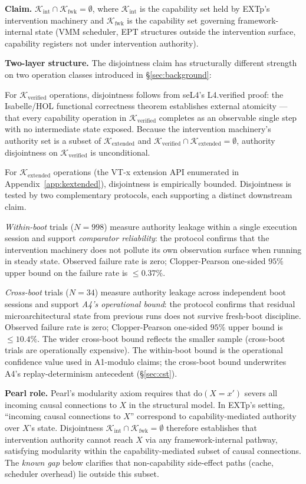 \documentclass[conference]{IEEEtran}
\newcommand{\Kverified}{\mathcal{K}_\text{verified}}
\newcommand{\Kextended}{\mathcal{K}_\text{extended}}
\newcommand{\Kint}{\mathcal{K}_\text{int}}
\newcommand{\Kfwk}{\mathcal{K}_\text{fwk}}
\newcommand{\dox}[1]{\text{do}(X{=}#1)}
\begin{document}
\textbf{Claim.} $\Kint \cap \Kfwk = \emptyset$, where $\Kint$ is the
capability set held by EXTp's intervention machinery and $\Kfwk$ is
the capability set governing framework-internal state (VMM
scheduler, EPT structures outside the intervention surface,
capability registers not under intervention authority).

\textbf{Two-layer structure.} The disjointness claim has structurally
different strength on two operation classes introduced in
\S\ref{sec:background}:

For $\Kverified$ operations, disjointness follows from seL4's
L4.verified proof: the Isabelle/HOL functional correctness theorem
establishes external atomicity --- that every capability operation
in $\Kverified$ completes as an observable single step with no
intermediate state exposed. Because the intervention machinery's
authority set is a subset of $\Kextended$ and $\Kverified \cap
\Kextended = \emptyset$, authority disjointness on $\Kverified$ is
unconditional.

For $\Kextended$ operations (the VT-x extension API enumerated in
Appendix~\ref{app:kextended}), disjointness is empirically bounded.
Disjointness is tested by two complementary protocols, each
supporting a distinct downstream claim.

\textit{Within-boot} trials ($N{=}998$) measure authority leakage
within a single execution session and support \emph{comparator
reliability}: the protocol confirms that the intervention
machinery does not pollute its own observation surface when
running in steady state. Observed failure rate is zero;
Clopper-Pearson one-sided $95\%$ upper bound on the failure rate
is $\leq 0.37\%$.

\textit{Cross-boot} trials ($N{=}34$) measure authority leakage
across independent boot sessions and support \emph{A4's
operational bound}: the protocol confirms that residual
microarchitectural state from previous runs does not survive
fresh-boot discipline. Observed failure rate is zero;
Clopper-Pearson one-sided $95\%$ upper bound is $\leq 10.4\%$.
The wider cross-boot bound reflects the smaller sample (cross-boot
trials are operationally expensive). The within-boot bound is
the operational confidence value used in A1-modulo claims; the
cross-boot bound underwrites A4's replay-determinism antecedent
(\S\ref{sec:cst}).

\textbf{Pearl role.} Pearl's modularity axiom requires that
$\dox{x'}$ severs all incoming causal connections to $X$ in the
structural model. In EXTp's setting, ``incoming causal connections
to $X$'' correspond to capability-mediated authority over $X$'s
state. Disjointness $\Kint \cap \Kfwk = \emptyset$ therefore
establishes that intervention authority cannot reach $X$ via any
framework-internal pathway, satisfying modularity within the
capability-mediated subset of causal connections. The \emph{known
gap} below clarifies that non-capability side-effect paths (cache,
scheduler overhead) lie outside this subset.
\end{document}
